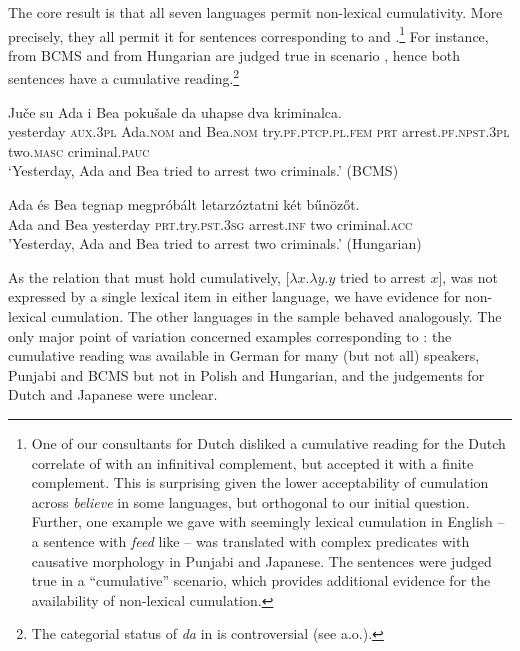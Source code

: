 \documentclass[output=paper]{langscibook}
\begin{document}
\noindent The core result is that all seven languages permit non-lexical cumulativity. More precisely, they all permit it for sentences corresponding to  and  .\footnote{One of our consultants for Dutch disliked a cumulative reading for the Dutch correlate of  with an infinitival complement, but accepted it with a finite complement. This is surprising given the lower acceptability of cumulation across \textit{believe} in some languages, but orthogonal to our initial question. Further, one example we gave with seemingly lexical cumulation in English -- a sentence with \textit{feed} like  -- was translated with complex predicates with causative morphology in Punjabi and Japanese. The sentences were judged true in a ``cumulative'' scenario, which provides additional evidence for the availability of non-lexical cumulation.} 
For instance,   from BCMS and  from Hungarian are judged true in scenario , hence both sentences have a cumulative reading.\footnote{The categorial status of \textit{da} in  is controversial (see \citealt{Todorovic:2020} a.o.).}

\ea\label{has-sch:se1} \gll Ju\v{c}e su Ada i Bea poku\v{s}ale da uhapse dva kriminalca.\\
yesterday \textsc{aux.3pl} Ada.\textsc{nom} and Bea.\textsc{nom} try.\textsc{pf.ptcp.pl.fem} \textsc{prt} arrest.\textsc{pf.npst.3pl} two.\textsc{masc} criminal.\textsc{pauc} \\
\glt `Yesterday, Ada and Bea tried to arrest two criminals.' \phantom{.}\hfill (BCMS)
\z 

\ea\label{has-sch:hu1} \gll Ada \'{e}s Bea tegnap megpr\'{o}b\'{a}lt letarz\'{o}ztatni k\'{e}t b\H{u}n\"{o}z\H{o}t. \\
Ada and Bea yesterday \textsc{prt}.try.\textsc{pst}.\textsc{3sg} arrest.\textsc{inf} two criminal.\textsc{acc} \\
\glt 'Yesterday, Ada and Bea tried to arrest two criminals.' \phantom{.}\hfill (Hungarian) 
\z

\noindent As the relation that must hold cumulatively, [$\lambda x.\lambda y. y$ tried to arrest $x$], was not expressed by a single lexical item in either language, we have evidence for non-lexical cumulation. The other languages in the sample behaved analogously. The only major point of variation concerned examples corresponding to : the cumulative reading was available in German for many (but not all) speakers, Punjabi and BCMS but not in Polish and Hungarian, and the judgements for Dutch and Japanese were unclear. 
\end{document}
